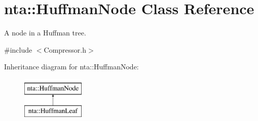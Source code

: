 \hypertarget{classnta_1_1HuffmanNode}{}\section{nta\+:\+:Huffman\+Node Class Reference}
\label{classnta_1_1HuffmanNode}


A node in a Huffman tree.  




{\ttfamily \#include $<$Compressor.\+h$>$}

Inheritance diagram for nta\+:\+:Huffman\+Node\+:\begin{figure}[H]
\begin{center}
\leavevmode
\includegraphics[height=2.000000cm]{da/dbb/classnta_1_1HuffmanNode}
\end{center}
\end{figure}
